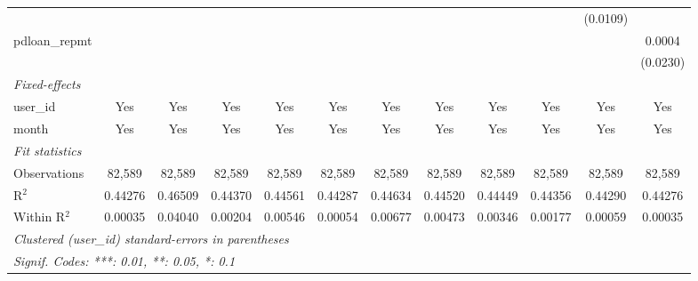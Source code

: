 \begin{table}[htbp]
\begin{tiny}
\begin{tabular}{lccccccccccc}
                                &                &                &                &                &                &                &                &                &                & (0.0109)       &   \\
         pdloan\_repmt         &                &                &                &                &                &                &                &                &                &                & 0.0004\\
                                &                &                &                &                &                &                &                &                &                &                & (0.0230)\\
         \midrule \emph{Fixed-effects} &   &   &   &   &   &   &   &   &   &   &  \\
         user\_id              & Yes            & Yes            & Yes            & Yes            & Yes            & Yes            & Yes            & Yes            & Yes            & Yes            & Yes\\
         month                  & Yes            & Yes            & Yes            & Yes            & Yes            & Yes            & Yes            & Yes            & Yes            & Yes            & Yes\\
         \midrule \emph{Fit statistics} &   &   &   &   &   &   &   &   &   &   &  \\
         Observations           & 82,589         & 82,589         & 82,589         & 82,589         & 82,589         & 82,589         & 82,589         & 82,589         & 82,589         & 82,589         & 82,589\\
         R$^2$                  & 0.44276        & 0.46509        & 0.44370        & 0.44561        & 0.44287        & 0.44634        & 0.44520        & 0.44449        & 0.44356        & 0.44290        & 0.44276\\
         Within R$^2$           & 0.00035        & 0.04040        & 0.00204        & 0.00546        & 0.00054        & 0.00677        & 0.00473        & 0.00346        & 0.00177        & 0.00059        & 0.00035\\
         \midrule\midrule\multicolumn{12}{l}{\emph{Clustered (user\_id) standard-errors in parentheses}}\\
         \multicolumn{12}{l}{\emph{Signif. Codes: ***: 0.01, **: 0.05, *: 0.1}}\\
      \end{tabular}
   \end{tiny}
\end{table}


